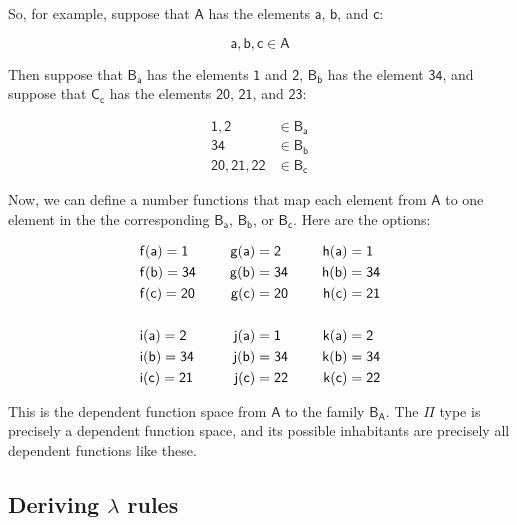 \documentclass{article}
\newcommand\term{\mathsf}
\def\PiBinder/{\Pi}
\def\abstrBinder/{\lambda}
\begin{document}
So, for example, suppose that $\term{A}$ has the elements $\term{a}$, $\term{b}$, and $\term{c}$:

\begin{equation*}
  \term{a}, \term{b}, \term{c} \in \term{A}
\end{equation*}

Then suppose that $\term{B_{a}}$ has the elements $\term{1}$ and $\term{2}$, $\term{B_{b}}$ has the element $\term{34}$, and suppose that $\term{C_{c}}$ has the elements $\term{20}$, $\term{21}$, and $\term{23}$:

\begin{align*}
  \term{1}, \term{2} &\in \term{B_{a}} \\
  \term{34} &\in \term{B_{b}} \\
  \term{20}, \term{21}, \term{22} &\in \term{B_{c}}
\end{align*} 

Now, we can define a number functions that map each element from $\term{A}$ to one element in the the corresponding $\term{B_{a}}$, $\term{B_{b}}$, or $\term{B_{c}}$. Here are the options:

\begin{align*}
  &\term{f(a)} = \term{1} \hskip 0.5cm &\term{g(a)} &= \term{2} \hskip 0.5cm &\term{h(a)} &= \term{1} \\
  &\term{f(b)} = \term{34} \hskip 0.5cm &\term{g(b)} &= \term{34} \hskip 0.5cm &\term{h(b)} &= \term{34} \\
  &\term{f(c)} = \term{20} \hskip 0.5cm &\term{g(c)} &= \term{20} \hskip 0.5cm &\term{h(c)} &= \term{21} \\
  \\
  &\term{i(a)} = \term{2} \hskip 0.5cm &\term{j(a)} &= \term{1} \hskip 0.5cm &\term{k(a)} &= \term{2} \\
  &\term{i(b)} = \term{34} \hskip 0.5cm &\term{j(b)} &= \term{34} \hskip 0.5cm &\term{k(b)} &= \term{34} \\
  &\term{i(c)} = \term{21} \hskip 0.5cm &\term{j(c)} &= \term{22} \hskip 0.5cm &\term{k(c)} &= \term{22}
\end{align*}

This is the dependent function space from $\term{A}$ to the family $\term{B_{A}}$. The $\PiBinder/$ type is precisely a dependent function space, and its possible inhabitants are precisely all dependent functions like these.


\subsection{Deriving $\abstrBinder/$ rules}
\end{document}
